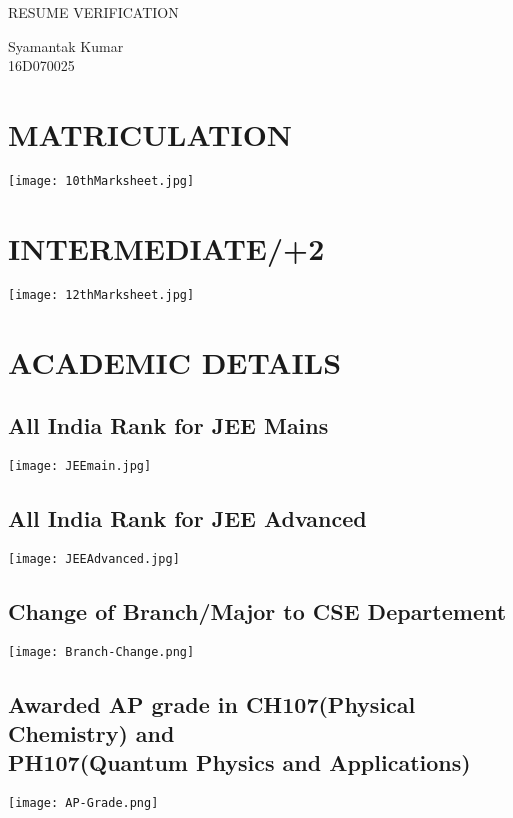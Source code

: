 \documentclass{article}
\begin{document}
	\begin{titlepage}
		\vspace*{\fill}
		\begin{center}
			\LARGE RESUME VERIFICATION\\
		\end{center}
		\begin{center}
			\Large Syamantak Kumar \\
			\Large 16D070025
			
		\end{center}
		\vspace*{\fill}
	\end{titlepage}
	\tableofcontents
	\newpage
	\section{MATRICULATION}
		\texttt{[image: 10thMarksheet.jpg]}{\centering}
	\section{INTERMEDIATE/+2}
		\texttt{[image: 12thMarksheet.jpg]}{\centering}
	\section{ACADEMIC DETAILS}
		\subsection{All India Rank for JEE Mains }
	\texttt{[image: JEEmain.jpg]}{\centering}
	\subsection{All India Rank for JEE Advanced }
		\texttt{[image: JEEAdvanced.jpg]}{\centering}
	\subsection{Change of Branch/Major to CSE Departement}
	\begin{center}
		\texttt{[image: Branch-Change.png]}{\centering}
	\end{center}
    \subsection{Awarded AP grade in CH107(Physical Chemistry) and \\ PH107(Quantum  Physics and Applications)}
	\begin{center}
		\texttt{[image: AP-Grade.png]}{\centering}
	\end{center}
\end{document}

